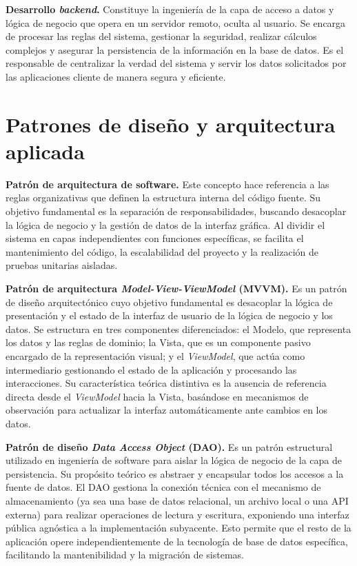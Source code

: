 \textbf{Desarrollo \textit{backend}.} Constituye la ingeniería de la capa de acceso a datos y lógica de negocio que opera en un servidor remoto, oculta al usuario. Se encarga de procesar las reglas del sistema, gestionar la seguridad, realizar cálculos complejos y asegurar la persistencia de la información en la base de datos. Es el responsable de centralizar la verdad del sistema y servir los datos solicitados por las aplicaciones cliente de manera segura y eficiente.

\section{Patrones de diseño y arquitectura aplicada}

\textbf{Patrón de arquitectura de software.} Este concepto hace referencia a las reglas organizativas que definen la estructura interna del código fuente. Su objetivo fundamental es la separación de responsabilidades, buscando desacoplar la lógica de negocio y la gestión de datos de la interfaz gráfica. Al dividir el sistema en capas independientes con funciones específicas, se facilita el mantenimiento del código, la escalabilidad del proyecto y la realización de pruebas unitarias aisladas.

\textbf{Patrón de arquitectura \textit{Model-View-ViewModel} (MVVM).} Es un patrón de diseño arquitectónico cuyo objetivo fundamental es desacoplar la lógica de presentación y el estado de la interfaz de usuario de la lógica de negocio y los datos. Se estructura en tres componentes diferenciados: el Modelo, que representa los datos y las reglas de dominio; la Vista, que es un componente pasivo encargado de la representación visual; y el \textit{ViewModel}, que actúa como intermediario gestionando el estado de la aplicación y procesando las interacciones. Su característica teórica distintiva es la ausencia de referencia directa desde el \textit{ViewModel} hacia la Vista, basándose en mecanismos de observación para actualizar la interfaz automáticamente ante cambios en los datos.

\textbf{Patrón de diseño \textit{Data Access Object} (DAO).} Es un patrón estructural utilizado en ingeniería de software para aislar la lógica de negocio de la capa de persistencia. Su propósito teórico es abstraer y encapsular todos los accesos a la fuente de datos. El DAO gestiona la conexión técnica con el mecanismo de almacenamiento (ya sea una base de datos relacional, un archivo local o una API externa) para realizar operaciones de lectura y escritura, exponiendo una interfaz pública agnóstica a la implementación subyacente. Esto permite que el resto de la aplicación opere independientemente de la tecnología de base de datos específica, facilitando la mantenibilidad y la migración de sistemas.

